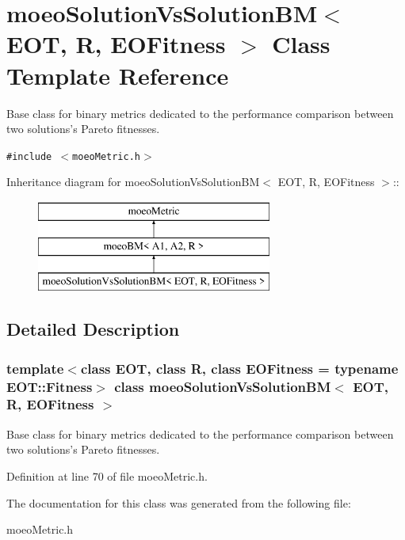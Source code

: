 \section{moeo\-Solution\-Vs\-Solution\-BM$<$ EOT, R, EOFitness $>$ Class Template Reference}
\label{classmoeoSolutionVsSolutionBM}
Base class for binary metrics dedicated to the performance comparison between two solutions's Pareto fitnesses.  


{\tt \#include $<$moeo\-Metric.h$>$}

Inheritance diagram for moeo\-Solution\-Vs\-Solution\-BM$<$ EOT, R, EOFitness $>$::\begin{figure}[H]
\begin{center}
\leavevmode
\includegraphics[height=3cm]{classmoeoSolutionVsSolutionBM}
\end{center}
\end{figure}


\subsection{Detailed Description}
\subsubsection*{template$<$class EOT, class R, class EOFitness = typename EOT::Fitness$>$ class moeo\-Solution\-Vs\-Solution\-BM$<$ EOT, R, EOFitness $>$}

Base class for binary metrics dedicated to the performance comparison between two solutions's Pareto fitnesses. 



Definition at line 70 of file moeo\-Metric.h.

The documentation for this class was generated from the following file:\begin{CompactItemize}
\item 
moeo\-Metric.h\end{CompactItemize}
